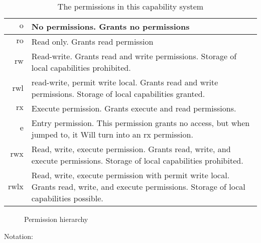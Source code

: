 \documentclass[a4paper]{article}
\newcommand{\plainperm}[1]{\mathrm{#1}}
\newcommand{\noperm}{\plainperm{o}}
\newcommand{\readonly}{\plainperm{ro}}
\newcommand{\readwrite}{\plainperm{rw}}
\newcommand{\exec}{\plainperm{rx}}
\newcommand{\entry}{\plainperm{e}}
\newcommand{\rwx}{\plainperm{rwx}}
\newcommand{\readwritel}{\plainperm{rwl}}
\newcommand{\rwlx}{\plainperm{rwlx}}
\begin{document}
\begin{table}[!h]
  \centering
  \begin{tabular}[!h]{r |  p{7cm} }
  $\noperm$ & No permissions. Grants no permissions\\
\hline
  $\readonly$ & Read only. Grants read permission \\
\hline
  $\readwrite$ & Read-write. Grants read and write permissions. Storage of local capabilities prohibited. \\
\hline
  $\readwritel$ & read-write, permit write local. Grants read and write permissions. Storage of local capabilities granted. \\
\hline
  $\exec$ & Execute permission. Grants execute and read permissions.\\
\hline
  $\entry$ & Entry permission. This permission grants no access, but when jumped to, it Will turn into an $\exec$ permission.\\
\hline
  $\rwx$ & Read, write, execute permission. Grants read, write, and execute permissions. Storage of local capabilities prohibited. \\
\hline
  $\rwlx$ & Read, write, execute permission with permit write local. Grants read, write, and execute permissions. Storage of local capabilities possible.
\end{tabular}

\caption{The permissions in this capability system}
\label{tab:permission-list}
\end{table}
\begin{figure}[!h]
  \centering

\caption{Permission hierarchy}
\label{fig:perm-hier}
\end{figure}
Notation:
\end{document}
